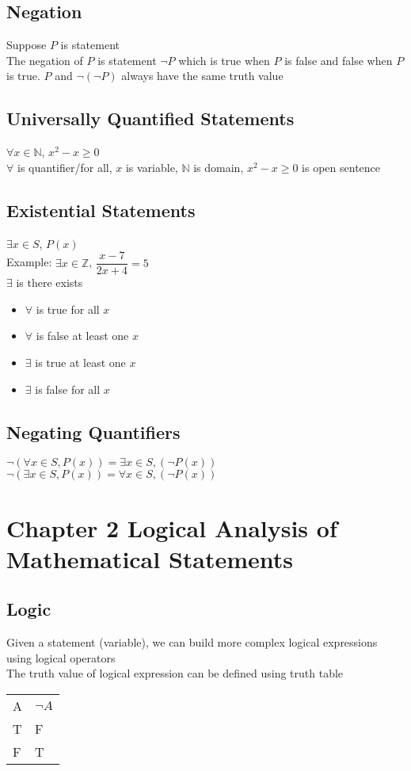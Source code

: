\documentclass[12pt, letterpaper]{article}
\begin{document}
\subsection{Negation}
Suppose $P$ is statement \\
The negation of $P$ is statement $\neg P$ which is true when $P$ is false and false when $P$ is true. $P$ and $\neg(\neg P)$ always have the same truth value
\subsection{Universally Quantified Statements}
$\forall x \in \mathbb{N}$, $x^2-x \geq 0$ \\
$\forall$ is quantifier/for all, $x$ is variable, $\mathbb{N}$ is domain, $x^2-x \geq 0$ is open sentence
\subsection{Existential Statements}
$\exists x \in S$, $P(x)$ \\
Example: $\exists x \in \mathbb{Z}$, $\dfrac{x-7}{2x+4} = 5$ \\
$\exists$ is there exists
\begin{itemize}
    \item $\forall$ is true for all $x$
    \item $\forall$ is false at least one $x$
    \item $\exists$ is true at least one $x$
    \item $\exists$ is false for all $x$
\end{itemize}
\subsection{Negating Quantifiers}
$\neg (\forall x \in S, P(x)) = \exists x \in S, (\neg P(x))$ \\
$\neg (\exists x \in S, P(x)) = \forall x \in S, (\neg P(x))$

\section{Chapter 2 Logical Analysis of Mathematical Statements}
\subsection{Logic}
Given a statement (variable), we can build more complex logical expressions using logical operators \\
The truth value of logical expression can be defined using truth table 
\begin{center}
\begin{tabular}{|l|l|}
    A   &$\neg A$ \\
    T   &F        \\
    F   &T        \\
\end{tabular}
\end{center}
\end{document}
